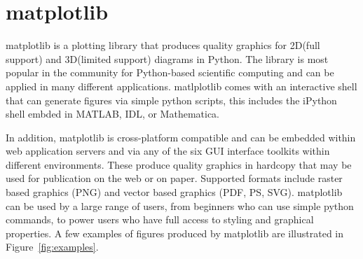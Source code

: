 \documentclass[pdftex,10pt,a4paper]{report}
\begin{document}
\section{matplotlib}

matplotlib is a plotting library that produces quality graphics for 2D(full support) and 3D(limited support) diagrams in Python. The library is most popular in the community for Python-based scientific computing  and can be applied in many different applications. matlplotlib comes with an interactive shell that can generate figures via simple python scripts, this includes the iPython shell embded in MATLAB, IDL, or Mathematica. 

In addition, matplotlib is cross-platform compatible and can be embedded within web application servers and via any of the six GUI interface toolkits within different environments. These produce quality graphics in hardcopy that may be used for publication on the web or on paper. Supported formats include raster based graphics (PNG) and vector based graphics (PDF, PS, SVG). matplotlib can be used by a large range of users, from beginners who can use simple python commands, to power users who have full access to styling and graphical properties. A few examples of figures produced by matplotlib are illustrated in Figure~\ref{fig:examples}.
\end{document}

